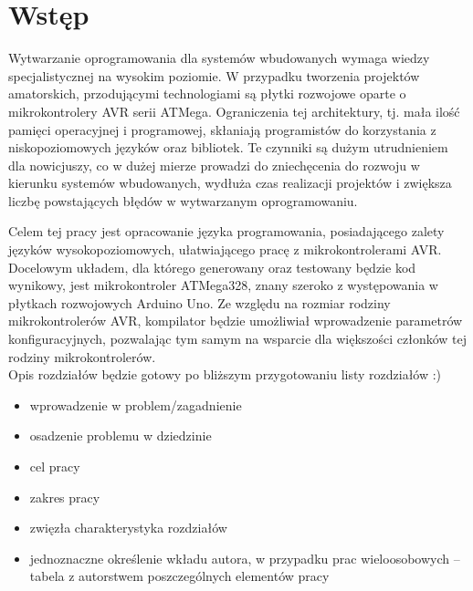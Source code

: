 \chapter{Wstęp}
\label{ch:wstep}

Wytwarzanie oprogramowania dla systemów wbudowanych wymaga wiedzy specjalistycznej na wysokim poziomie. W przypadku tworzenia projektów amatorskich, przodującymi technologiami są płytki rozwojowe oparte o mikrokontrolery AVR serii ATMega. Ograniczenia tej architektury, tj. mała ilość pamięci operacyjnej i programowej, skłaniają programistów do korzystania z niskopoziomowych języków oraz bibliotek. Te czynniki są dużym utrudnieniem dla nowicjuszy, co w dużej mierze prowadzi do zniechęcenia do rozwoju w kierunku systemów wbudowanych, wydłuża czas realizacji projektów i zwiększa liczbę powstających błędów w wytwarzanym oprogramowaniu.

Celem tej pracy jest opracowanie języka programowania, posiadającego zalety języków wysokopoziomowych, ułatwiającego pracę z mikrokontrolerami AVR. Docelowym układem, dla którego generowany oraz testowany będzie kod wynikowy, jest mikrokontroler ATMega328, znany szeroko z występowania w płytkach rozwojowych Arduino Uno. Ze względu na rozmiar rodziny mikrokontrolerów AVR, kompilator będzie umożliwiał wprowadzenie parametrów konfiguracyjnych, pozwalając tym samym na wsparcie dla większości członków tej rodziny mikrokontrolerów.\\

Opis rozdziałów będzie gotowy po bliższym przygotowaniu listy rozdziałów :)

\begin{itemize}
\item wprowadzenie w problem/zagadnienie
\item osadzenie problemu w dziedzinie
\item cel pracy
\item zakres pracy
\item zwięzła charakterystyka rozdziałów
\item jednoznaczne określenie wkładu autora, w przypadku prac wieloosobowych – tabela z autorstwem poszczególnych elementów pracy
\end{itemize}